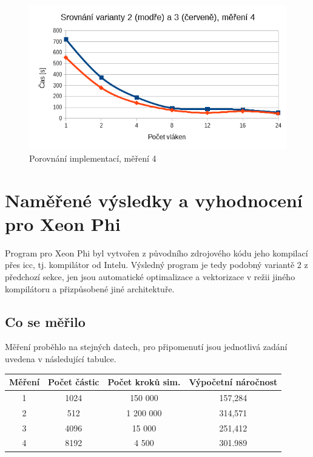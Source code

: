 \documentclass[12pt]{article}
\begin{document}
\begin{figure}
  \begin{center}
      \includegraphics[width=12cm]{images/vs4.png}	
    \caption{Porovnání implementací, měření 4}
  \end{center}
\end{figure}

\section{Naměřené výs\-led\-ky a vyhod\-noce\-ní pro Xeon Phi}
Program pro Xeon Phi byl vytvořen z původního zdrojového kódu jeho kompilací přes icc, tj. kompilátor od Intelu.
Výsledný program je tedy podobný variantě 2 z předchozí sekce, jen jsou automatické optimalizace a vektorizace v režii jiného kompilátoru a přizpůsobené jiné architektuře.

\subsection{Co se měřilo}
Měření proběhlo na stejných datech, pro připomenutí jsou jednotlivá zadání uvedena v následující tabulce.

\begin{center}
\begin{tabular}{c | c | c | c}
\textbf{Měření} & \textbf{Počet částic} & \textbf{Počet kroků sim.} & \textbf{Výpočetní náročnost} \\ \hline \hline
1 & 1024 & 150 000 & 157,284 \\ \hline
2 & 512 & 1 200 000 & 314,571 \\ \hline
3 & 4096 & 15 000 & 251,412 \\ \hline
4 & 8192 & 4 500 & 301.989 \\ \hline
\end{tabular}
\end{center}
\end{document}
